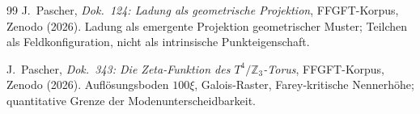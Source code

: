 \begin{thebibliography}{99}
J.~Pascher,
\textit{Dok.~124: Ladung als geometrische Projektion},
FFGFT-Korpus, Zenodo (2026).
Ladung als emergente Projektion geometrischer Muster; Teilchen als
Feldkonfiguration, nicht als intrinsische Punkteigenschaft.

J.~Pascher,
\textit{Dok.~343: Die Zeta-Funktion des $T^4/\mathbb{Z}_3$-Torus},
FFGFT-Korpus, Zenodo (2026).
Auflösungsboden $100\xi$, Galois-Raster, Farey-kritische Nennerhöhe;
quantitative Grenze der Mo\-den\-un\-ter\-scheid\-bar\-keit.

\end{thebibliography}
